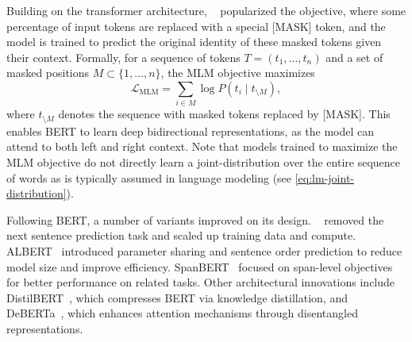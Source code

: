 
Building on the transformer architecture, ~\citep{devlin2019bert} popularized the  objective, where some percentage of input tokens are replaced with a special [MASK] token, and the model is trained to predict the original identity of these masked tokens given their context. Formally, for a sequence of tokens $T = (t_1, \ldots, t_n)$ and a set of masked positions $M \subset \{1, \ldots, n\}$, the MLM objective maximizes
\begin{equation}
    \mathcal{L}_{\text{MLM}} = \sum_{i \in M} \log P(t_i \mid t_{\setminus M}),
\end{equation}
where $t_{\setminus M}$ denotes the sequence with masked tokens replaced by [MASK]. This enables BERT to learn deep bidirectional representations, as the model can attend to both left and right context. Note that models trained to maximize the MLM objective do not directly learn a joint-distribution over the entire sequence of words as is typically assumed in language modeling (see \cref{eq:lm-joint-distribution}).

Following BERT, a number of variants improved on its design. ~\citep{liu2019roberta} removed the next sentence prediction task and scaled up training data and compute. ALBERT~\citep{lan2019albert} introduced parameter sharing and sentence order prediction to reduce model size and improve efficiency. SpanBERT~\citep{joshi2020spanbert} focused on span-level objectives for better performance on related tasks. Other architectural innovations include DistilBERT~\citep{sanh2019distilbert}, which compresses BERT via knowledge distillation, and DeBERTa~\citep{he2021deberta}, which enhances attention mechanisms through disentangled representations.

